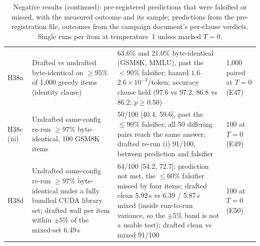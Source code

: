 \documentclass[11pt]{article}
\begin{document}
\begin{table}[p]
\begin{tabular}{L{0.85cm}L{5.0cm}L{6.95cm}L{3.05cm}}
H38a & Drafted vs undrafted byte-identical on $\ge95\%$ of 1,000 greedy items (identity clause) & 63.6\% and 21.0\% byte-identical (GSM8K, MMLU), past the $<90\%$ falsifier; hazard $1.6$--$2.6\times10^{-3}$/token; accuracy clause held (97.6 vs 97.2, 86.8 vs 86.2; $p\ge0.50$) & 1,000 paired at $T{=}0$ (E47) \\
H38c (iii) & Undrafted same-config re-run $\ge97\%$ byte-identical, 100 GSM8K items & 50/100 [40.4, 59.6], past the $\le90\%$ falsifier; all 50 differing pairs reach the same answer; drafted re-run (i) 91/100, between prediction and falsifier & 100 at $T{=}0$ (E49) \\
H38d & Undrafted same-config re-run $\ge97\%$ byte-identical under a fully bundled CUDA library set; drafted wall per item within $\pm5\%$ of the mixed-set 6.49\,s & 64/100 [54.2, 72.7]: prediction not met, the $\le60\%$ falsifier missed by four items; drafted clean 5.92\,s vs 6.39 / 5.87\,s mixed (inside run-to-run variance, so the $\pm5\%$ band is not a usable test); drafted clean vs mixed 91/100 & 100 at $T{=}0$ (E50) \\
\bottomrule
\end{tabular}
\caption{Negative results (continued): pre-registered predictions that were falsified or
missed, with the measured outcome and its sample; predictions from the
pre-registration file, outcomes from the campaign document's per-clause
verdicts. Single runs per item at temperature~1 unless marked $T{=}0$.}

\end{table}
\end{document}

